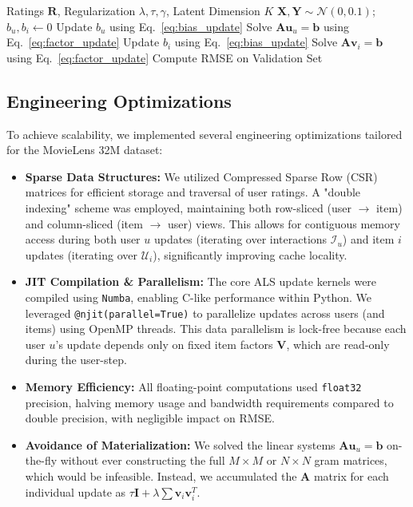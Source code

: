 \documentclass{article}
\theoremstyle{plain}
\theoremstyle{definition}
\theoremstyle{remark}
\begin{document}
\begin{algorithm}[h]
   \caption{Parallel Alternating Least Squares with Biases}
   \label{alg:als}
\begin{algorithmic}
    Ratings $\mathbf{R}$, Regularization $\lambda, \tau, \gamma$, Latent Dimension $K$
    $\mathbf{X}, \mathbf{Y} \sim \mathcal{N}(0, 0.1)$; $b_u, b_i \leftarrow 0$
           \STATE Update $b_u$ using Eq.~\ref{eq:bias_update}
           \STATE Solve $\mathbf{A}\mathbf{u}_u = \mathbf{b}$ using Eq.~\ref{eq:factor_update}
       \ENDFOR
           \STATE Update $b_i$ using Eq.~\ref{eq:bias_update}
           \STATE Solve $\mathbf{A}\mathbf{v}_i = \mathbf{b}$ using Eq.~\ref{eq:factor_update}
       \ENDFOR
       \STATE Compute RMSE on Validation Set
   \ENDFOR
\end{algorithmic}
\end{algorithm}

\subsection{Engineering Optimizations}
To achieve scalability, we implemented several engineering optimizations tailored for the MovieLens 32M dataset:
\begin{itemize}
    \item \textbf{Sparse Data Structures:} We utilized Compressed Sparse Row (CSR) matrices for efficient storage and traversal of user ratings. A "double indexing" scheme was employed, maintaining both row-sliced (user $\to$ item) and column-sliced (item $\to$ user) views. This allows for contiguous memory access during both user $u$ updates (iterating over interactions $\mathcal{I}_u$) and item $i$ updates (iterating over $\mathcal{U}_i$), significantly improving cache locality.
    \item \textbf{JIT Compilation \& Parallelism:} The core ALS update kernels were compiled using \texttt{Numba}, enabling C-like performance within Python. We leveraged \texttt{@njit(parallel=True)} to parallelize updates across users (and items) using OpenMP threads. This data parallelism is lock-free because each user $u$'s update depends only on fixed item factors $\mathbf{V}$, which are read-only during the user-step.
    \item \textbf{Memory Efficiency:} All floating-point computations used \texttt{float32} precision, halving memory usage and bandwidth requirements compared to double precision, with negligible impact on RMSE.
    \item \textbf{Avoidance of Materialization:} We solved the linear systems $\mathbf{A}\mathbf{u}_u = \mathbf{b}$ on-the-fly without ever constructing the full $M \times M$ or $N \times N$ gram matrices, which would be infeasible. Instead, we accumulated the $\mathbf{A}$ matrix for each individual update as $\tau\mathbf{I} + \lambda \sum \mathbf{v}_i\mathbf{v}_i^T$.
\end{itemize}
\end{document}
